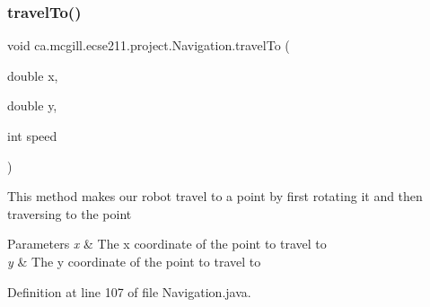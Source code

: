 \subsubsection{\texorpdfstring{travel\+To()}{travelTo()}}
{\footnotesize\ttfamily void ca.\+mcgill.\+ecse211.\+project.\+Navigation.\+travel\+To (\begin{DoxyParamCaption}\item[{double}]{x,  }\item[{double}]{y,  }\item[{int}]{speed }\end{DoxyParamCaption})}

This method makes our robot travel to a point by first rotating it and then traversing to the point


\begin{DoxyParams}{Parameters}
{\em x} & The x coordinate of the point to travel to \\
\hline
{\em y} & The y coordinate of the point to travel to \\
\hline
\end{DoxyParams}


Definition at line 107 of file Navigation.\+java.


